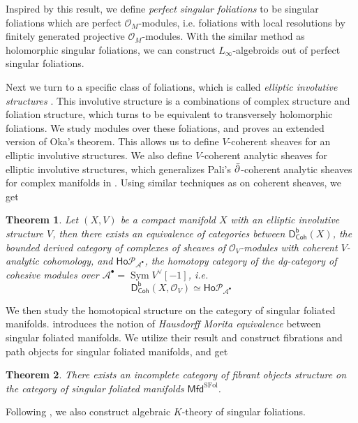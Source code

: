 \documentclass[12pt]{amsart}
\newtheorem{theorem}{Theorem}[section]
\theoremstyle{definition}
\theoremstyle{remark}
\numberwithin{equation}{section}
\newcommand{\del}{\partial}
\renewcommand{\del}{\partial}
\newcommand{\CA}{{\mathcal A}}
\newcommand{\CO}{{\mathcal O}}
\newcommand{\1}{{\mathbb{1}}}
\newcommand{\mfd}{\mathsf{Mfd}}
\newcommand{\ho}{\mathsf{Ho}}
\newcommand{\dcoh}{\mathsf{D^b_{Coh}}}
\newcommand{\sfol}{{\operatorname{SFol}}}
\newcommand{\sym}{\operatorname{Sym}}
\begin{document}
Inspired by this result, we define {\it perfect singular foliations} to be singular foliations which are  perfect $\CO_M$-modules, i.e. foliations with local resolutions by finitely generated projective $\CO_M$-modules. With the similar method as holomorphic singular foliations, we can construct $L_{\infty}$-algebroids out of perfect singular foliations.

Next we turn to a specific class of foliations, which is called {\it elliptic involutive structures} \cite{Tre09}\cite{BCH14}\cite{Kor14}. This involutive structure is a  combinations of complex structure and foliation structure, which turns to be equivalent to transversely holomorphic foliations. We study modules over these foliations, and proves an extended version of Oka's theorem. This allows us to define $V$-coherent sheaves for an elliptic involutive structures. We also define $V$-coherent analytic sheaves for elliptic involutive structures, which generalizes Pali's $\Bar{\del}$-coherent analytic sheaves for complex manifolds in \cite{Pal03}. Using similar techniques as \cite{Blo05} on coherent sheaves,  we get 

\begin{theorem}
    Let $(X, V)$ be a compact manifold $X$ with an elliptic involutive structure $V$, then there exists an equivalence of categories between $\dcoh(X)$, the bounded derived category of
complexes of sheaves of $\CO_V$-modules with coherent $V$-analytic cohomology, and $\ho \mathcal{P}_{\CA^{\bullet}}$, the homotopy category of the dg-category of cohesive modules over $\CA^{\bullet} = \sym V^{\vee}[-1]$, i.e.   
\begin{equation*}
    \dcoh(X, \CO_V) \simeq \ho \mathcal{P}_{\CA^{\bullet}}
\end{equation*}
\end{theorem}


We then  study the homotopical structure on the category of singular foliated manifolds. \cite{GZ19} introduces the notion of {\it Hausdorff Morita equivalence} between singular foliated manifolds. We utilize their result and construct fibrations and path objects for singular foliated manifolds, and get 
\begin{theorem}
There exists an incomplete category of fibrant objects structure on the category of singular foliated manifolds $\mfd^{\sfol}$.
\end{theorem}
Following \cite{Bun18}, we also construct algebraic $K$-theory of singular foliations.
\end{document}
